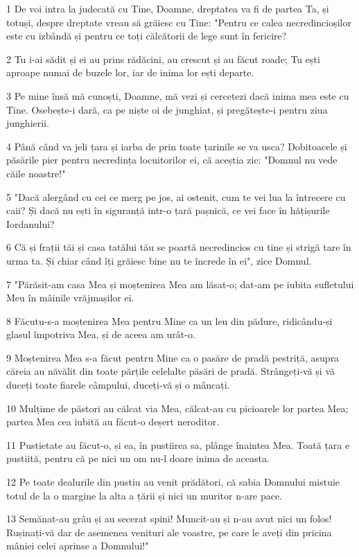 \par 1 De voi intra la judecată cu Tine, Doamne, dreptatea va fi de partea Ta, și totuși, despre dreptate vreau să grăiesc cu Tine: "Pentru ce calea necredincioșilor este cu izbândă și pentru ce toți călcătorii de lege sunt în fericire?
\par 2 Tu i-ai sădit și ei au prins rădăcini, au crescut și au făcut roade; Tu ești aproape numai de buzele lor, iar de inima lor ești departe.
\par 3 Pe mine însă mă cunoști, Doamne, mă vezi și cercetezi dacă inima mea este cu Tine. Osebește-i dară, ca pe niște oi de junghiat, și pregătește-i pentru ziua junghierii.
\par 4 Până când va jeli țara și iarba de prin toate țarinile se va usca? Dobitoacele și păsările pier pentru necredința locuitorilor ei, că aceștia zic: "Domnul nu vede căile noastre!"
\par 5 "Dacă alergând cu cei ce merg pe jos, ai ostenit, cum te vei lua la întrecere cu caii? Și dacă nu ești în siguranță intr-o țară pașnică, ce vei face în hățișurile Iordanului?
\par 6 Că și frații tăi și casa tatălui tău se poartă necredincios cu tine și strigă tare în urma ta. Și chiar când îți grăiesc bine nu te încrede în ei", zice Domnul.
\par 7 "Părăsit-am casa Mea și moștenirea Mea am lăsat-o; dat-am pe iubita sufletului Meu în mâinile vrăjmașilor ei.
\par 8 Făcutu-s-a moștenirea Mea pentru Mine ca un leu din pădure, ridicându-și glasul împotriva Mea, și de aceea am urât-o.
\par 9 Moștenirea Mea s-a făcut pentru Mine ca o pasăre de pradă pestriță, asupra căreia au năvălit din toate părțile celelalte păsări de pradă. Strângeți-vă și vă duceți toate fiarele câmpului, duceți-vă și o mâncați.
\par 10 Mulțime de păstori au călcat via Mea, călcat-au cu picioarele lor partea Mea; partea Mea cea iubită au făcut-o deșert neroditor.
\par 11 Pustietate au făcut-o, și ea, în pustiirea sa, plânge înaintea Mea. Toată țara e pustiită, pentru că pe nici un om nu-l doare inima de aceasta.
\par 12 Pe toate dealurile din pustiu au venit prădători, că sabia Domnului mistuie totul de la o margine la alta a țării și nici un muritor n-are pace.
\par 13 Semănat-au grâu și au secerat spini! Muncit-au și n-au avut nici un folos! Rușinați-vă dar de asemenea venituri ale voastre, pe care le aveți din pricina mâniei celei aprinse a Domnului!"
